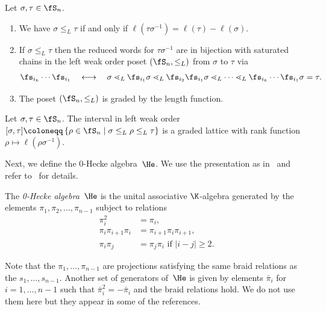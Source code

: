 \begin{prop} 
		\label{thm:properties_bruhat_order}
	Let $\sigma,\tau \in \fS_n$.
	\begin{enumerate}
		\item We have $\sigma \leq_L \tau$ if and only if $\ell(\tau\sigma^{-1}) = \ell(\tau) - \ell(\sigma)$.
		\item If $\sigma\leq_L \tau$ then the reduced words for $\tau\sigma^{-1}$ are in bijection with saturated chains in the left weak order poset $(\fS_n, \leq_L)$ from $\sigma$ to $\tau$ via 
		\begin{align*}
		\fs_{i_k} \cdots \fs_{i_1} \quad \longleftrightarrow \quad \sigma \lessdot_L \fs_{i_1} \sigma \lessdot_L \fs_{i_2}\fs_{i_1} \sigma \lessdot_L\dots \lessdot_L \fs_{i_k} \cdots \fs_{i_1}\sigma = \tau.
		\end{align*}
		\item The poset $(\fS_n, \leq_L)$ is graded by the length function.
	\end{enumerate}
\end{prop}

\begin{thm}
	\label{thm:bruhat_interval}
	Let $\sigma,\tau\in \fS_n$. The interval in left weak order $[\sigma, \tau] \coloneqq \left\{\rho \in \fS_n \mid \sigma \leq_L \rho \leq_L \tau \right\}$ is a graded lattice with rank function $\rho \mapsto \ell(\rho \sigma^{-1})$.
\end{thm}
 
Next, we define the 0-Hecke algebra~$\He$. We use the presentation as in~\cite{Tewari2015} and refer to~\cite[Ch.~1]{Mathas1999} for details.

\begin{defi}
	\label{thm:0-Hecke algebra}
	The \emph{0-Hecke algebra}~$\He$ is the unital associative $\K$-algebra generated by the elements $\pi_1,\pi_2,\dots ,\pi_{n-1}$ subject to relations
	\begin{align*}
	\pi_i^2 &= \pi_i, \\
	\pi_i\pi_{i+1}\pi_i &= \pi_{i+1} \pi_{i} \pi_{i+1}, \\
	\pi_i \pi_j &= \pi_j \pi_i \text{ if } |i-j| \geq 2. 	 
	\end{align*}
\end{defi}

Note that the $\pi_1,\dots, \pi_{n-1}$ are projections satisfying the same braid relations as the $s_1, \ldots, s_{n-1}$.
Another set of generators of~$\He$ is given by elements $\bar \pi_i$ for $i=1,\dots, n-1$ such that $\bar \pi_i^2 = - \bar \pi_i$ and the braid relations hold.
We do not use them here but they appear in some of the references.

